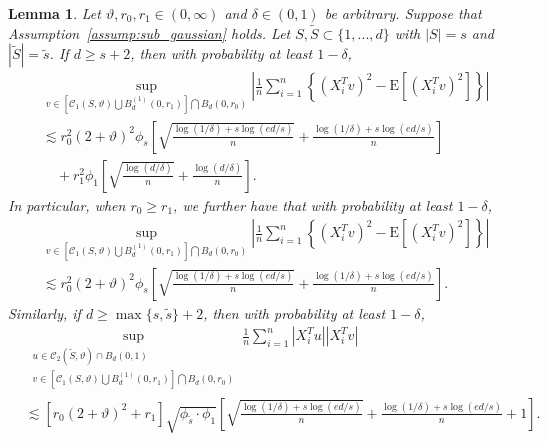 \documentclass[ejsv2,noshowframe]{imsart}
\theoremstyle{plain}
\newtheorem{lemma}[theorem]{Lemma}
\theoremstyle{definition}
\theoremstyle{remark}
\renewcommand{\tilde}{\widetilde}
\begin{document}
\vspace{3mm}

\begin{lemma}
	\label{lem:cone_ball_bnd}
	Let $\vartheta,r_0,r_1 \in (0,\infty)$ and $\delta \in (0,1)$ be arbitrary. Suppose that Assumption~\ref{assump:sub_gaussian} holds. Let $S,\tilde{S}\subset \{1,...,d\}$ with $|S|=s$ and $|\tilde{S}|=\tilde{s}$. If $d\geq s+2$, then with probability at least $1-\delta$,
	\begin{align*}
		&\sup_{v\in \left[\mathcal{C}_1(S,\vartheta) \bigcup B_d^{(1)}(0,r_1) \right] \bigcap B_d(0,r_0)} \left|\frac{1}{n} \sum_{i=1}^n \left\{(X_i^Tv)^2 - \mathrm{E}\left[(X_i^Tv)^2\right] \right\}\right| \\
		&\lesssim r_0^2 (2+\vartheta)^2 \phi_s\left[\sqrt{\frac{\log(1/\delta) + s\log(ed/s)}{n}} + \frac{\log(1/\delta)  + s\log(ed/s)}{n} \right] \\
		&\quad + r_1^2\phi_1 \left[\sqrt{\frac{\log(d/\delta)}{n}} + \frac{\log(d/\delta)}{n}\right].
	\end{align*}
	In particular, when $r_0\geq r_1$, we further have that with probability at least $1-\delta$,
	\begin{align*}
		&\sup_{v\in \left[\mathcal{C}_1(S,\vartheta) \bigcup B_d^{(1)}(0,r_1) \right] \bigcap B_d(0,r_0)} \left|\frac{1}{n} \sum_{i=1}^n \left\{(X_i^Tv)^2 - \mathrm{E}\left[(X_i^Tv)^2\right] \right\}\right| \\
		&\lesssim r_0^2 (2+\vartheta)^2 \phi_s\left[\sqrt{\frac{\log(1/\delta) + s\log(ed/s)}{n}} + \frac{\log(1/\delta)  + s\log(ed/s)}{n} \right].
	\end{align*}
	Similarly, if $d\geq \max\{s,\tilde{s}\} +2$, then with probability at least $1-\delta$,
	\begin{align*}
		&\sup_{\substack{u \in \mathcal{C}_2(\tilde{S},\vartheta) \cap B_d(0,1)\\v\in \left[\mathcal{C}_1(S,\vartheta) \bigcup B_d^{(1)}(0,r_1) \right] \bigcap B_d(0,r_0)}} \frac{1}{n} \sum_{i=1}^n \left|X_i^Tu \right| \left|X_i^Tv \right| \\
		&\lesssim \left[r_0(2+\vartheta)^2+r_1\right] \sqrt{\phi_{\tilde{s}} \cdot \phi_1} \left[\sqrt{\frac{\log(1/\delta) + s\log(ed/s)}{n}} + \frac{\log(1/\delta)  + s\log(ed/s)}{n} + 1\right].
	\end{align*}
\end{lemma}
\end{document}
